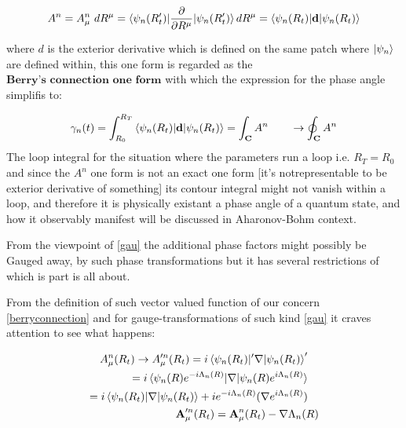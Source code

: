 \documentclass[8pt, twocoloumn]{article}
\begin{document}
\begin{align}{\label{oneform}}
A^n= A^n_\mu \ dR^{\mu}=\braket{\psi_n(R_t')|\frac{\partial}{\partial R^{\mu}}|\psi_n(R_t')}  dR^{\mu}=\braket{\psi_n(R_t)|\textbf{d}|\psi_n(R_t)}
\end{align}

where $d$ is the exterior derivative which is defined on the same patch where $\ket{\psi_n}$ are defined within, this one form is regarded as the $ \textbf{Berry's connection one form}$ with which the expression for the phase angle simplifis to: 

\begin{align}
\gamma_n(t)=\int_{R_0}^{R_T}\braket{\psi_n(R_t)|\textbf{d}|\psi_n(R_t)} = \int_{\textbf{C}}A^n \ \ \ \ \ \ \to \oint_{\textbf{C}}A^n
\end{align}
The loop integral for the situation where the parameters run a loop i.e. $R_T = R_0$ and since the $A^n$ one form is not an exact one form [it's notrepresentable to be exterior derivative of something] its contour integral might not vanish within a loop, and therefore it is physically existant a phase angle of a quantum state, and how it observably manifest will be discussed in Aharonov-Bohm context. 

From the viewpoint of \ref{gau} the additional phase factors might possibly be Gauged away, by such phase transformations but it has several restrictions of which is part is all about.

From the definition of such vector valued function of our concern \ref{berryconnection} and for gauge-transformations of such kind \ref{gau} it craves attention to see what happens: 

\begin{align} {\label{gaugeinvariance11}}
\begin{split}
A^n_{\mu}(R_t) \to A'^n_{\mu}(R_t) ={}& i \braket{\psi_n (R_t)|'\nabla|\psi_n(R_t)}'
\end{split} \notag \\
\begin{split}
={}& i \braket{\psi_n(R)e^{-i\Lambda_n(R)}|\nabla | \psi_n(R)e^{i\Lambda_n(R)}}
\end{split} \notag  \\
\begin{split}
={}& i \braket{\psi_n (R_t)|\nabla|\psi_n(R_t)} + i e^{-i\Lambda_n(R)}(\nabla e^{i\Lambda_n(R)})
\end{split} \notag \\
\begin{split}
\textbf{A}'^n_{\mu}(R_t) = \textbf{A}^n_{\mu}(R_t)-\nabla \Lambda_n(R)
\end{split}
\end{align}
\end{document}
